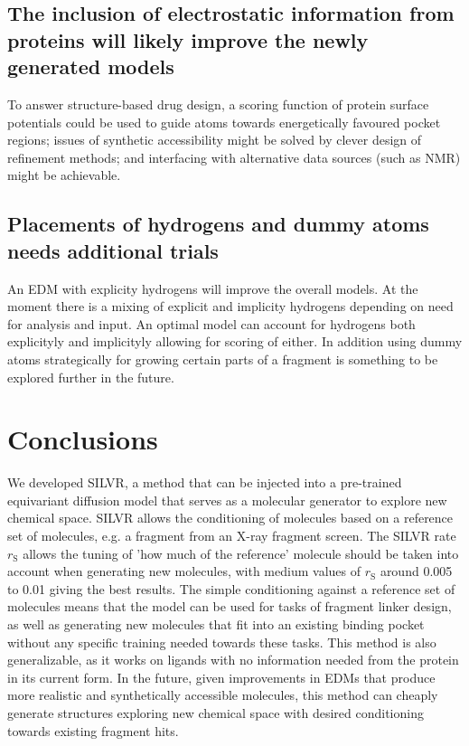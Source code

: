 \documentclass[journal=jacsat,manuscript=article]{achemso}
\begin{document}
\subsection{The inclusion of electrostatic information from proteins will likely improve the newly generated models}
To answer structure-based drug design, a scoring function of protein surface potentials could be used to guide atoms towards energetically favoured pocket regions; issues of synthetic accessibility might be solved by clever design of refinement methods; and interfacing with alternative data sources (such as NMR) might be achievable. 

\subsection{Placements of hydrogens and dummy atoms needs additional trials}
An EDM with explicity hydrogens will improve the overall models. At the moment there is a mixing of explicit and implicity hydrogens depending on need for analysis and input. An optimal model can account for hydrogens both explicityly and implicityly allowing for scoring of either. In addition using dummy atoms strategically for growing certain parts of a fragment is something to be explored further in the future. 


\section{Conclusions}
We developed SILVR, a method that can be injected into a pre-trained equivariant diffusion model that serves as a molecular generator to explore new chemical space. SILVR allows the conditioning of molecules based on a reference set of molecules, e.g. a fragment from an X-ray fragment screen. The SILVR rate $r_{\mathrm{S}}$ allows the tuning of 'how much of the reference' molecule should be taken into account when generating new molecules, with medium values of $r_{\mathrm{S}}$ around 0.005 to 0.01 giving the best results. The simple conditioning against a reference set of molecules means that the model can be used for tasks of fragment linker design, as well as generating new molecules that fit into an existing binding pocket without any specific training needed towards these tasks. This method is also generalizable, as it works on ligands with no information needed from the protein in its current form. In the future, given improvements in EDMs that produce more realistic and synthetically accessible molecules, this method can cheaply generate structures exploring new chemical space with desired conditioning towards existing fragment hits.
\end{document}

